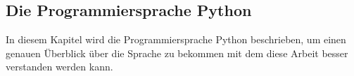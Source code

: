 \subsection{Die Programmiersprache Python}\label{einleitung:python}

In diesem Kapitel wird die Programmiersprache Python beschrieben, um
einen genauen Überblick über die Sprache zu bekommen mit dem diese
Arbeit besser verstanden werden kann.
